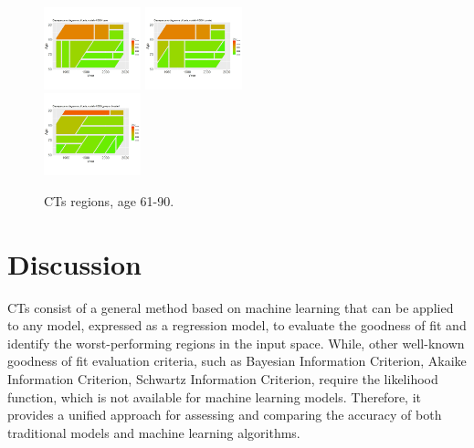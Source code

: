 \documentclass[fleqn,10pt]{wlscirep}
\begin{document}
\begin{figure}[H]
{\includegraphics[width=0.25\textwidth]{xgbm_61.jpeg}}
{\includegraphics[width=0.25\textwidth]{xgbm_61_b.jpeg}}\\
{\includegraphics[width=0.25\textwidth]{xgbm_preproc_61_b.jpeg}}\\
\caption{CTs regions, age 61-90.}
\label{fig:CT2}
\end{figure}

\section*{Discussion}

CTs consist of a general method based on machine learning that can be applied to any model, expressed as a regression model, to evaluate the goodness of fit and identify the worst-performing regions in the input space. While, other well-known goodness of fit evaluation criteria, such as Bayesian Information Criterion, Akaike Information Criterion, Schwartz Information Criterion, require the likelihood function, which is not available for machine learning models. Therefore, it provides a unified approach for assessing and comparing the accuracy of both traditional models and machine learning algorithms.
\end{document}
